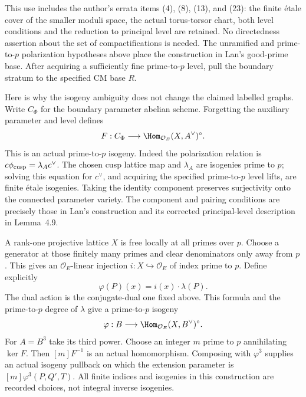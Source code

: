 This use includes the author's errata items (4), (8), (13),
and (23): the finite \'etale cover of the smaller
moduli space, the actual torus-torsor chart, both level
conditions and the reduction to principal level are retained.
No directedness assertion about the set of compactifications
is needed. The unramified and prime-to-$p$ polarization
hypotheses above place the construction in Lan's good-prime
base. After acquiring a sufficiently fine prime-to-$p$ level,
pull the boundary stratum to the specified CM base $R$.

Here is why the isogeny ambiguity does not change the claimed
labelled graphs. Write $C_\Phi$ for the boundary parameter
abelian scheme. Forgetting the auxiliary parameter and level
defines
\[
 F:C_\Phi\longrightarrow
       \Hom_{\mathcal O_E}(X,A^\vee)^\circ.
\]
This is an actual prime-to-$p$ isogeny. Indeed the polarization
relation is $c\phi_{\rm cusp}=\lambda_Ac^\vee$. The chosen
cusp lattice map and $\lambda_A$ are isogenies prime to $p$;
solving this equation for $c^\vee$, and acquiring the specified
prime-to-$p$ level lifts, are finite \'etale isogenies.
Taking the identity component preserves surjectivity onto the
connected parameter variety. The component and pairing
conditions are precisely those in Lan's construction and its
corrected principal-level description in Lemma~4.9.

A rank-one projective lattice $X$ is free locally at all
primes over $p$. Choose a generator at those finitely many
primes and clear denominators only away from $p$. This gives
an $\mathcal O_E$-linear injection $i:X\hookrightarrow
\mathcal O_E$ of index prime to $p$. Define explicitly
\[
        \varphi(P)(x)=i(x)\cdot\lambda(P).
\]
The dual action is the conjugate-dual one fixed above.
This formula and the prime-to-$p$ degree of $\lambda$ give
a prime-to-$p$ isogeny
\[
       \varphi:B\longrightarrow
               \Hom_{\mathcal O_E}(X,B^\vee)^\circ.
\]
For $A=B^3$ take its third power. Choose an integer $m$
prime to $p$ annihilating $\ker F$.
Then $[m]F^{-1}$ is an actual homomorphism. Composing with
$\varphi^3$ supplies an actual isogeny pullback on which
the extension parameter is $[m]\varphi^3(P,Q',T)$.
All finite indices and isogenies in this construction are
recorded choices, not integral inverse isogenies.

